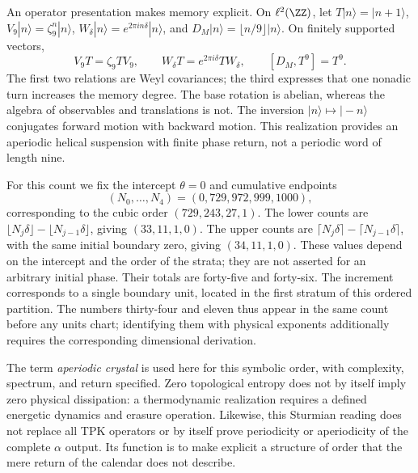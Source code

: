 An operator presentation makes memory explicit. On \(\ell^2(\ZZ)\), let \(T|n\rangle=|n+1\rangle\), \(V_9|n\rangle=\zeta_9^n|n\rangle\), \(W_\delta|n\rangle=e^{2\pi i n\delta}|n\rangle\), and \(D_M|n\rangle=\lfloor n/9\rfloor|n\rangle\). On finitely supported vectors,
\begin{equation}
 V_9T=\zeta_9TV_9,\qquad
 W_\delta T=e^{2\pi i\delta}TW_\delta,\qquad
 [D_M,T^9]=T^9.
 \label{eq:weyl-relojes}
\end{equation}
The first two relations are Weyl covariances; the third expresses that one nonadic turn increases the memory degree. The base rotation is abelian, whereas the algebra of observables and translations is not. The inversion \(|n\rangle\mapsto|-n\rangle\) conjugates forward motion with backward motion. This realization provides an aperiodic helical suspension with finite phase return, not a periodic word of length nine.



For this count we fix the intercept \(\theta=0\) and cumulative endpoints
\[
(N_0,\ldots,N_4)=(0,729,972,999,1000),
\]
corresponding to the cubic order \((729,243,27,1)\). The lower counts are \(\lfloor N_j\delta\rfloor-\lfloor N_{j-1}\delta\rfloor\), giving \((33,11,1,0)\). The upper counts are \(\lceil N_j\delta\rceil-\lceil N_{j-1}\delta\rceil\), with the same initial boundary zero, giving \((34,11,1,0)\). These values depend on the intercept and the order of the strata; they are not asserted for an arbitrary initial phase. Their totals are forty-five and forty-six. The increment corresponds to a single boundary unit, located in the first stratum of this ordered partition. The numbers thirty-four and eleven thus appear in the same count before any units chart; identifying them with physical exponents additionally requires the corresponding dimensional derivation.

The term \emph{aperiodic crystal} is used here for this symbolic order, with complexity, spectrum, and return specified. Zero topological entropy does not by itself imply zero physical dissipation: a thermodynamic realization requires a defined energetic dynamics and erasure operation. Likewise, this Sturmian reading does not replace all TPK operators or by itself prove periodicity or aperiodicity of the complete \(\alpha\) output. Its function is to make explicit a structure of order that the mere return of the calendar does not describe.






